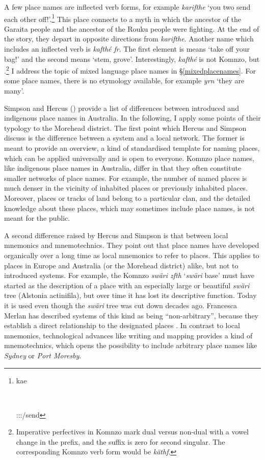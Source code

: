 A few place names are inflected verb forms, for example \emph{karifthe} `you two send each other off!'.\footnote{\parbox{0.02cm}{\hfill}\parbox{6cm}{kae}\\ \parbox{0.001cm}{\hfill}\parbox{6.06cm}{\Stdu:\Sbj:\Imp:\Pfv/send}} This place connects to a myth in which the ancestor of the Garaita people and the ancestor of the Rouku people were fighting. At the end of the story, they depart in opposite directions from \emph{karifthe}. Another name which includes an inflected verb is \emph{kafthé fr}. The first element is means `take off your bag!' and the second means `stem, grove'. Interestingly, \emph{kafthé} is not Komnzo, but .\footnote{Imperative perfectives in Komnzo mark dual versus non-dual with a vowel change in the prefix, and the suffix is zero for second singular. The corresponding Komnzo verb form would be \emph{käthf}.} I address the topic of mixed language place names in \S\ref{mixedplacenames}. For some place names, there is no etymology available, for example \emph{yrn} `they are many'.

Simpson and Hercus (\citeyear{Hercus:2002ul}) provide a list of differences between introduced and indigenous place names in Australia. In the following, I apply some points of their typology to the Morehead district. The first point which Hercus and Simpson discuss is the difference between a system and a local network. The former is meant to provide an overview, a kind of standardised template for naming places, which can be applied universally and is open to everyone. Komnzo place names, like indigenous place names in Australia, differ in that they often constitute smaller networks of place names. For example, the number of named places is much denser in the vicinity of inhabited places or previously inhabited places. Moreover, places or tracks of land belong to a particular clan, and the detailed knowledge about these places, which may sometimes include place names, is not meant for the public.

A second difference raised by Hercus and Simpson is that between local mnemonics and mnemotechnics. They point out that place names have developed organically over a long time as local mnemonics to refer to places. This applies to places in Europe and Australia (or the Morehead district) alike, but not to introduced  systems. For example, the Komnzo  \emph{swäri zfth} `\emph{swäri} base' must have started as the description of a place with an especially large or beautiful \emph{swäri} tree (Alstonia actinifila), but over time it has lost its descriptive function. Today it is used even though the \emph{swäri} tree was cut down decades ago. Francesca Merlan has described  systems of this kind as being ``non-arbitrary'', because they establish a direct relationship to the designated places \citep{Merlan:2001wp}. In contrast to local mnemonics, technological advances like writing and mapping provides a kind of mnemotechnics, which opens the possibility to include arbitrary place names like \emph{Sydney} or \emph{Port Moresby}.


